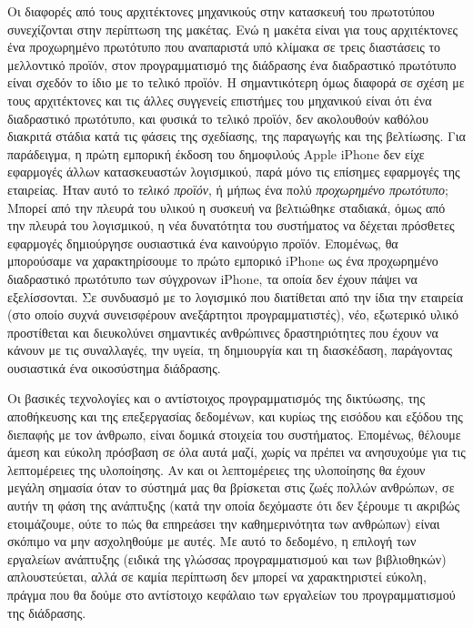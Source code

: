 \documentclass[
]{article}
\begin{document}
Οι διαφορές από τους αρχιτέκτονες μηχανικούς στην κατασκευή του
πρωτοτύπου συνεχίζονται στην περίπτωση της μακέτας. Ενώ η μακέτα είναι
για τους αρχιτέκτονες ένα προχωρημένο πρωτότυπο που αναπαριστά υπό
κλίμακα σε τρεις διαστάσεις το μελλοντικό προϊόν, στον προγραμματισμό
της διάδρασης ένα διαδραστικό πρωτότυπο είναι σχεδόν το ίδιο με το
τελικό προϊόν. Η σημαντικότερη όμως διαφορά σε σχέση με τους
αρχιτέκτονες και τις άλλες συγγενείς επιστήμες του μηχανικού είναι ότι
ένα διαδραστικό πρωτότυπο, και φυσικά το τελικό προϊόν, δεν ακολουθούν
καθόλου διακριτά στάδια κατά τις φάσεις της σχεδίασης, της παραγωγής και
της βελτίωσης. Για παράδειγμα, η πρώτη εμπορική έκδοση του δημοφιλούς
Apple iPhone δεν είχε εφαρμογές άλλων κατασκευαστών λογισμικού, παρά
μόνο τις επίσημες εφαρμογές της εταιρείας. Ήταν αυτό το \emph{τελικό
προϊόν}, ή μήπως ένα πολύ \emph{προχωρημένο πρωτότυπο}; Μπορεί από την
πλευρά του υλικού η συσκευή να βελτιώθηκε σταδιακά, όμως από την πλευρά
του λογισμικού, η νέα δυνατότητα του συστήματος να δέχεται πρόσθετες
εφαρμογές δημιούργησε ουσιαστικά ένα καινούργιο προϊόν. Επομένως, θα
μπορούσαμε να χαρακτηρίσουμε το πρώτο εμπορικό iPhone ως ένα προχωρημένο
διαδραστικό πρωτότυπο των σύγχρονων iPhone, τα οποία δεν έχουν πάψει να
εξελίσσονται. Σε συνδυασμό με το λογισμικό που διατίθεται από την ίδια
την εταιρεία (στο οποίο συχνά συνεισφέρουν ανεξάρτητοι προγραμματιστές),
νέο, εξωτερικό υλικό προστίθεται και διευκολύνει σημαντικές ανθρώπινες
δραστηριότητες που έχουν να κάνουν με τις συναλλαγές, την υγεία, τη
δημιουργία και τη διασκέδαση, παράγοντας ουσιαστικά ένα οικοσύστημα
διάδρασης.

Οι βασικές τεχνολογίες και ο αντίστοιχος προγραμματισμός της δικτύωσης,
της αποθήκευσης και της επεξεργασίας δεδομένων, και κυρίως της εισόδου
και εξόδου της διεπαφής με τον άνθρωπο, είναι δομικά στοιχεία του
συστήματος. Επομένως, θέλουμε άμεση και εύκολη πρόσβαση σε όλα αυτά
μαζί, χωρίς να πρέπει να ανησυχούμε για τις λεπτομέρειες της υλοποίησης.
Αν και οι λεπτομέρειες της υλοποίησης θα έχουν μεγάλη σημασία όταν το
σύστημά μας θα βρίσκεται στις ζωές πολλών ανθρώπων, σε αυτήν τη φάση της
ανάπτυξης (κατά την οποία δεχόμαστε ότι δεν ξέρουμε τι ακριβώς
ετοιμάζουμε, ούτε το πώς θα επηρεάσει την καθημερινότητα των ανθρώπων)
είναι σκόπιμο να μην ασχοληθούμε με αυτές. Με αυτό το δεδομένο, η
επιλογή των εργαλείων ανάπτυξης (ειδικά της γλώσσας προγραμματισμού και
των βιβλιοθηκών) απλουστεύεται, αλλά σε καμία περίπτωση δεν μπορεί να
χαρακτηριστεί εύκολη, πράγμα που θα δούμε στο αντίστοιχο κεφάλαιο των
εργαλείων του προγραμματισμού της διάδρασης.
\end{document}
